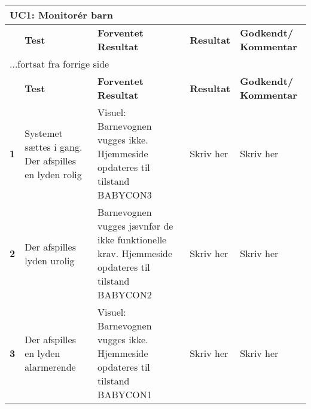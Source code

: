 \begin{center}
	\label{accepttest:uc1} 
\begin{longtable}{|p{}|p{}|p{}|p{}|p{}|} %
\hline
\multicolumn{5}{|l|}{\textbf{UC1: Monitorér barn}} \\ \hline
\multicolumn{1}{|c|}{} &
\textbf{Test} &
\textbf{Forventet \newline Resultat} &
\textbf{Resultat} &
\textbf{Godkendt/ \newline Kommentar} \\ \hline 
\endfirsthead

\multicolumn{5}{l}{...fortsat fra forrige side} \\ \hline 
\multicolumn{1}{|c|}{} &
\textbf{Test} &
\textbf{Forventet \newline Resultat} &
\textbf{Resultat} &
\textbf{Godkendt/ \newline Kommentar} \\ \hline 
\endhead



\textbf{1}	&Systemet sættes i gang. Der afspilles en lyden rolig
			&Visuel: Barnevognen vugges ikke. Hjemmeside opdateres til tilstand BABYCON3
			&Skriv her
			&Skriv her 
			\\\hline

\textbf{2}	&Der afspilles lyden urolig
			&Barnevognen vugges jævnfør de ikke funktionelle krav. Hjemmeside opdateres til tilstand BABYCON2
			&Skriv her
			&Skriv her 
			\\\hline
			 
\textbf{3}	&Der afspilles en lyden alarmerende
			&Visuel: Barnevognen vugges ikke. Hjemmeside opdateres til tilstand BABYCON1
			&Skriv her
			&Skriv her
			\\\hline

\end{longtable}
\end{center}